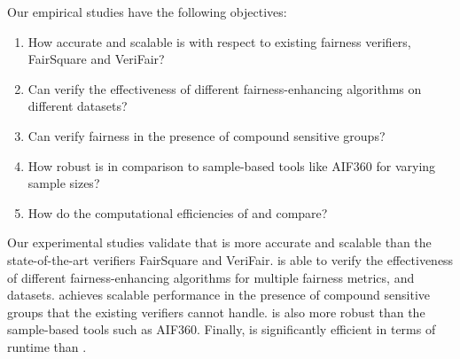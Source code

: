 Our empirical studies have the following objectives:

\begin{enumerate}
	\item How accurate and scalable {\justicia} is with respect to existing fairness verifiers, FairSquare and VeriFair?
	\item Can {\justicia} verify the effectiveness of different fairness-enhancing algorithms on different datasets?
	\item Can {\justicia} verify fairness in the presence of compound sensitive groups?
	\item How robust is {\justicia} in comparison to sample-based tools like AIF360 for varying sample sizes?
	\item How do the computational efficiencies of {\justicialearn} and {\justiciaenum} compare?
\end{enumerate}



Our experimental studies validate that {\justicia} is more accurate and scalable than the state-of-the-art verifiers FairSquare and VeriFair. {\justicia} is able to verify the effectiveness of different fairness-enhancing algorithms for multiple fairness metrics, and datasets. {\justicia} achieves scalable performance in the presence of compound sensitive groups that the existing verifiers cannot handle.  {\justicia} is also more robust than the sample-based tools such as AIF360.
Finally, {\justicialearn} is significantly efficient in terms of runtime than {\justiciaenum}.






